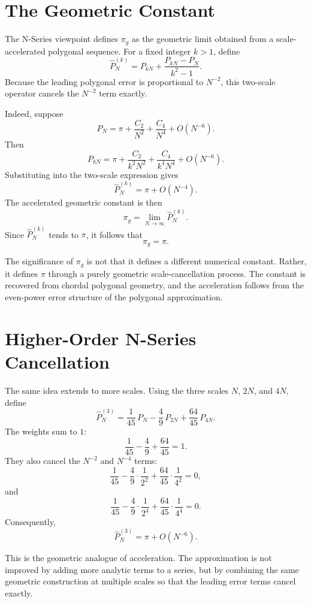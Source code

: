 \documentclass[11pt]{article}
\begin{document}
\section{The Geometric Constant}

The N-Series viewpoint defines $\pi_g$ as the geometric limit obtained from a
scale-accelerated polygonal sequence. For a fixed integer $k>1$, define
\[
  \widehat{P}^{(k)}_N = P_{kN} + \frac{P_{kN}-P_N}{k^2-1} .
\]
Because the leading polygonal error is proportional to $N^{-2}$, this
two-scale operator cancels the $N^{-2}$ term exactly.

Indeed, suppose
\[
  P_N = \pi + \frac{C_2}{N^2} + \frac{C_4}{N^4} + O(N^{-6}) .
\]
Then
\[
  P_{kN} = \pi + \frac{C_2}{k^2N^2} + \frac{C_4}{k^4N^4} + O(N^{-6}) .
\]
Substituting into the two-scale expression gives
\[
  \widehat{P}^{(k)}_N = \pi + O(N^{-4}) .
\]
The accelerated geometric constant is then
\[
  \pi_g = \lim_{N\to\infty} \widehat{P}^{(k)}_N .
\]
Since $\widehat{P}^{(k)}_N$ tends to $\pi$, it follows that
\[
  \pi_g = \pi .
\]

The significance of $\pi_g$ is not that it defines a different numerical
constant. Rather, it defines $\pi$ through a purely geometric
scale-cancellation process. The constant is recovered from chordal polygonal
geometry, and the acceleration follows from the even-power error structure of
the polygonal approximation.

\section{Higher-Order N-Series Cancellation}

The same idea extends to more scales. Using the three scales $N$, $2N$, and
$4N$, define
\[
  \widehat{P}^{(3)}_N
  = \frac{1}{45}\,P_N - \frac{4}{9}\,P_{2N} + \frac{64}{45}\,P_{4N} .
\]
The weights sum to $1$:
\[
  \frac{1}{45} - \frac{4}{9} + \frac{64}{45} = 1 .
\]
They also cancel the $N^{-2}$ and $N^{-4}$ terms:
\[
  \frac{1}{45} - \frac{4}{9}\cdot\frac{1}{2^2}
  + \frac{64}{45}\cdot\frac{1}{4^2} = 0,
\]
and
\[
  \frac{1}{45} - \frac{4}{9}\cdot\frac{1}{2^4}
  + \frac{64}{45}\cdot\frac{1}{4^4} = 0 .
\]
Consequently,
\[
  \widehat{P}^{(3)}_N = \pi + O(N^{-6}) .
\]

This is the geometric analogue of acceleration. The approximation is not
improved by adding more analytic terms to a series, but by combining the same
geometric construction at multiple scales so that the leading error terms
cancel exactly.
\end{document}
